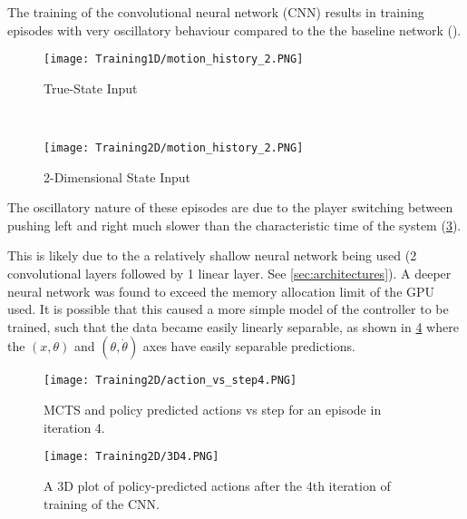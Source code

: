 \documentclass[../main.tex]{subfiles}
\begin{document}
The training of the convolutional neural network (CNN) results in training episodes with very oscillatory behaviour compared to the the baseline network ().

\begin{figure*}[h]
    \centering
    \begin{subfigure}[t]{0.49\textwidth}
        \centering
        \texttt{[image: Training1D/motion\_history\_2.PNG]}
        \caption{True-State Input}
        \label{fig:motion1D}
    \end{subfigure}%
    ~ 
    \begin{subfigure}[t]{0.49\textwidth}
        \centering
        \texttt{[image: Training2D/motion\_history\_2.PNG]}
        \caption{2-Dimensional State Input}
        \label{fig:motion2D}
    \end{subfigure}
    \caption{Motion history images showing the trajectories of 5 episodes for both neural networks. Higher valued colours represent more recent positions (or positions with multiple visits as the images are computed as a sum of discounted states).}
\end{figure*}

The oscillatory nature of these episodes are due to the player switching between pushing left and right much slower than the characteristic time of the system (\cref{fig:2Daction4}).

This is likely due to the a relatively shallow neural network being used (2 convolutional layers followed by 1 linear layer. See \cref{sec:architectures}). A deeper neural network was found to exceed the memory allocation limit of the GPU used. It is possible that this caused a more simple model of the controller to be trained, such that the data became easily linearly separable, as shown in \cref{fig:2D3D4} where the $(x, \theta)$ and $(\theta, \dot{\theta})$ axes have easily separable predictions. 

\begin{figure}[H]
    \centering
    \texttt{[image: Training2D/action\_vs\_step4.PNG]}
    \caption{MCTS and policy predicted actions vs step for an episode in iteration 4.}
    \label{fig:2Daction4}
\end{figure}
\begin{figure}[H]
    \centering
    \texttt{[image: Training2D/3D4.PNG]}
    \caption{A 3D plot of policy-predicted actions after the 4th iteration of training of the CNN.}
    \label{fig:2D3D4}
\end{figure}
\end{document}
